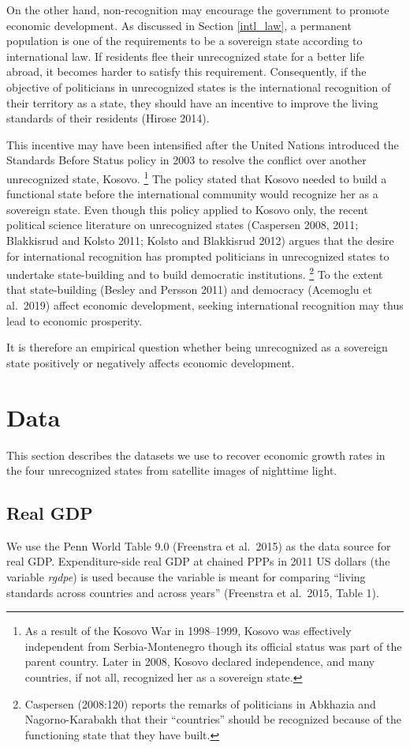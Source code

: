 \documentclass[12pt,a4paper]{article}%
\begin{document}
On the other hand, non-recognition may encourage the government to promote economic development. 
As discussed in Section \ref{intl_law}, a permanent population is one of the requirements to be a sovereign state according to international law.
If residents flee their unrecognized state for a better life abroad, it becomes harder to satisfy this requirement.
Consequently, if the objective of politicians in unrecognized states is the international recognition of their territory as a state, they should have an incentive to improve the living standards of their residents (Hirose 2014). 

This incentive may have been intensified after the United Nations introduced the Standards Before Status policy in 2003 to resolve the conflict over another unrecognized state, Kosovo.%
\footnote{
	As a result of the Kosovo War in 1998--1999, Kosovo was effectively independent from Serbia-Montenegro though its official status was part of the parent country.
	Later in 2008, Kosovo declared independence, and many countries, if not all, recognized her as a sovereign state. 
} 
The policy stated that Kosovo needed to build a functional state before the international community would recognize her as a sovereign state.
Even though this policy applied to Kosovo only, the recent political science literature on unrecognized states (Caspersen 2008, 2011; Blakkisrud and Kolsto 2011; Kolsto and Blakkisrud 2012) argues that the desire for international recognition has prompted politicians in unrecognized states to undertake state-building and to build democratic institutions.%
\footnote{
	Caspersen (2008:120) reports the remarks of politicians in Abkhazia and Nagorno-Karabakh that their ``countries'' should be recognized because of the functioning state that they have built.
	}
To the extent that state-building (Besley and Persson 2011) and democracy (Acemoglu et al.\ 2019) affect economic development, seeking international recognition may thus lead to economic prosperity.

It is therefore an empirical question whether being unrecognized as a sovereign state positively or negatively affects economic development.	

\section{Data}\label{data}
This section describes the datasets we use to recover economic growth rates in the four unrecognized states from satellite images of nighttime light.
\subsection{Real GDP}
We use the Penn World Table 9.0 (Freenstra et al.\ 2015) as the data source for real GDP. 
Expenditure-side real GDP at chained PPPs in 2011 US dollars (the variable \textit{rgdpe}) is used because the variable is meant for comparing ``living standards across countries and across years'' (Freenstra et al.\ 2015, Table 1).
\end{document}
